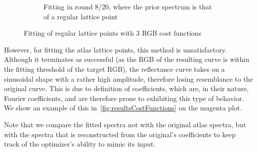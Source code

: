 \begin{figure}[t]
\begin{subfigure}[t]{0.45\textwidth}
		\caption{Fitting in round 8/20, where the prior spectrum is that of a regular lattice point}
		\label{fig:costFunctionsRegularRound8}
	\end{subfigure} 
	\caption{Fitting of regular lattice points with 3 RGB cost functions}
	\label{fig:costFunctionsRegularFitting}
\end{figure}

However, for fitting the atlas lattice points, this method is unsatisfactory. Although it terminates as successful (as the RGB of the resulting curve is within the fitting threshold of the target RGB), the reflectance curve takes on a sinusoidal shape with a rather high amplitude, therefore losing resemblance to the original curve. This is due to definition of coefficients, which are, in their nature, Fourier coefficients, and are therefore prone to exhibiting this type of behavior. We show an example of this in~\cref{fig:resultsCostFunctions} on the magenta plot. 
 
Note that we compare the fitted spectra not with the original atlas spectra, but with the spectra that is reconstructed from the original's coefficients to keep track of the optimizer's ability to mimic its input.


